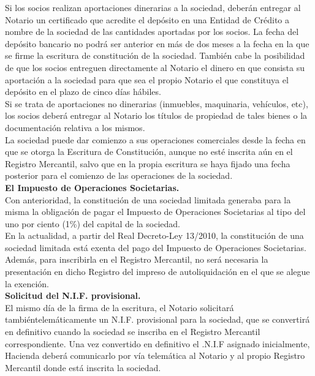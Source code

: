 Si los socios realizan aportaciones dinerarias a la sociedad, deberán entregar al Notario un certificado que acredite el depósito en una Entidad de Crédito a nombre de la sociedad de las cantidades aportadas por los socios. La fecha del depósito bancario no podrá ser anterior en más de dos meses a la fecha en la que se firme la escritura de constitución de la sociedad. También cabe la posibilidad de que los socios entreguen directamente al Notario el dinero en que consista su aportación a la sociedad para que sea el propio Notario el que constituya el depósito en el plazo de cinco días hábiles.\\
Si se trata de aportaciones no dinerarias (inmuebles, maquinaria, vehículos, etc), los socios deberá entregar al Notario los títulos de propiedad de tales bienes o la documentación relativa a los mismos.\\

La sociedad puede dar comienzo a sus operaciones comerciales desde la fecha en que se otorga la Escritura de Constitución, aunque no esté inscrita aún en el Registro Mercantil, salvo que en la propia escritura se haya fijado una fecha posterior para el comienzo de las operaciones de la sociedad.\\

\textbf{El Impuesto de Operaciones Societarias.}\\
Con anterioridad, la constitución de una sociedad limitada generaba para la misma la obligación de pagar el Impuesto de Operaciones Societarias al tipo del uno por ciento (1\%) del capital de la sociedad.\\

En la actualidad, a partir del Real Decreto-Ley 13/2010, la constitución de una sociedad limitada está exenta del pago del Impuesto de Operaciones Societarias. Además, para inscribirla en el Registro Mercantil, no será necesaria la presentación en dicho Registro del impreso de autoliquidación en el que se alegue la exención.\\

\textbf{Solicitud del N.I.F. provisional.}\\
El mismo día de la firma de la escritura, el Notario solicitará tambiéntelemáticamente un N.I.F. provisional para la sociedad, que se convertirá en definitivo cuando la sociedad se inscriba en el Registro Mercantil correspondiente. Una vez convertido en definitivo el .N.I.F asignado inicialmente, Hacienda deberá comunicarlo por vía telemática al Notario y al propio Registro Mercantil donde está inscrita la sociedad.\\

